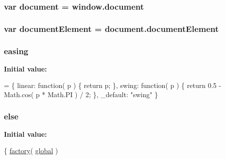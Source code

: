 \subsubsection[{\texorpdfstring{document}{document}}]{\setlength{\rightskip}{0pt plus 5cm}var document = window.\+document}\hypertarget{jquery-3_82_81_8js_af61dbe660d8213297c7fed5b5c99d223}{}\label{jquery-3_82_81_8js_af61dbe660d8213297c7fed5b5c99d223}
\subsubsection[{\texorpdfstring{document\+Element}{documentElement}}]{\setlength{\rightskip}{0pt plus 5cm}var document\+Element = document.\+document\+Element}\hypertarget{jquery-3_82_81_8js_a12d745c52a876a7d00f55b9b76d1e9ac}{}\label{jquery-3_82_81_8js_a12d745c52a876a7d00f55b9b76d1e9ac}
\subsubsection[{\texorpdfstring{easing}{easing}}]{ easing}\hypertarget{jquery-3_82_81_8js_a9758a312629fa6de1744280dd6e6253b}{}\label{jquery-3_82_81_8js_a9758a312629fa6de1744280dd6e6253b}
{\bfseries Initial value\+:}
\begin{DoxyCode}
= \{
    linear: \textcolor{keyword}{function}( p ) \{
        \textcolor{keywordflow}{return} p;
    \},
    swing: \textcolor{keyword}{function}( p ) \{
        \textcolor{keywordflow}{return} 0.5 - Math.cos( p * Math.PI ) / 2;
    \},
    \_default: \textcolor{stringliteral}{"swing"}
\}
\end{DoxyCode}
\subsubsection[{\texorpdfstring{else}{else}}]{\setlength{\rightskip}{0pt plus 5cm}else}\hypertarget{jquery-3_82_81_8js_a0544c3fe466e421738dae463968b70ba}{}\label{jquery-3_82_81_8js_a0544c3fe466e421738dae463968b70ba}
{\bfseries Initial value\+:}
\begin{DoxyCode}
\{
        \hyperlink{jquery-3_82_81_8js_abf075bdbe59fd2c3336ed052c9c72b31}{factory}( \hyperlink{jquery-3_82_81_8js_a57efe929cc6b44042891d05e15cec785}{global} )
\end{DoxyCode}
